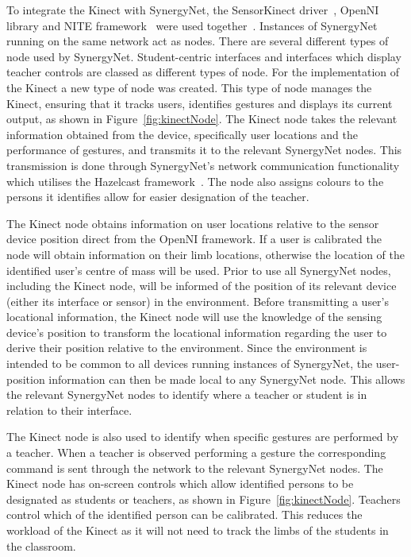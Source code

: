 \documentclass[link]{IWCOMP}
\begin{document}
To integrate the Kinect with SynergyNet, the SensorKinect driver~\cite{Avin2011}, OpenNI library and NITE framework~\cite{Organisation2011} were used together~\cite{Davison2012}.
Instances of SynergyNet running on the same network act as nodes.
There are several different types of node used by SynergyNet.
Student-centric interfaces and interfaces which display teacher controls are classed as different types of node.
For the implementation of the Kinect a new type of node was created.
This type of node manages the Kinect, ensuring that it tracks users, identifies gestures and displays its current output, as shown in Figure~\ref{fig:kinectNode}.
The Kinect node takes the relevant information obtained from the device, specifically user locations and the performance of gestures, and transmits it to the relevant SynergyNet nodes.
This transmission is done through SynergyNet's network communication functionality which utilises the Hazelcast framework~\cite{Hazelcast2009}.
The node also assigns colours to the persons it identifies allow for easier designation of the teacher.

The Kinect node obtains information on user locations relative to the sensor device position direct from the OpenNI framework.
If a user is calibrated the node will obtain information on their limb locations, otherwise the location of the identified user's centre of mass will be used.
Prior to use all SynergyNet nodes, including the Kinect node, will be informed of the position of its relevant device (either its interface or sensor) in the environment.
Before transmitting a user's locational information, the Kinect node will use the knowledge of the sensing device's position to transform the locational information regarding the user to derive their position relative to the environment.
Since the environment is intended to be common to all devices running instances of SynergyNet, the user-position information can then be made local to any SynergyNet node.
This allows the relevant SynergyNet nodes to identify where a teacher or student is in relation to their interface.

The Kinect node is also used to identify when specific gestures are performed by a teacher.
When a teacher is observed performing a gesture the corresponding command is sent through the network to the relevant SynergyNet nodes.
The Kinect node has on-screen controls which allow identified persons to be designated as students or teachers, as shown in Figure~\ref{fig:kinectNode}.
Teachers control which of the identified person can be calibrated.
This reduces the workload of the Kinect as it will not need to track the limbs of the students in the classroom.
\end{document}
